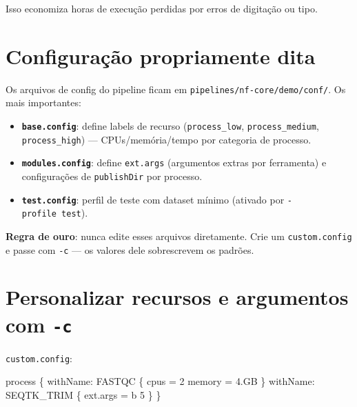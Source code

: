 \documentclass[
  brazilian,
  letterpaper,
  DIV=11,
  numbers=noendperiod]{scrreprt}
\newenvironment{Shaded}{\begin{snugshade}}{\end{snugshade}}
\newcommand{\DecValTok}[1]{\textcolor[rgb]{0.68,0.00,0.00}{#1}}
\newcommand{\FloatTok}[1]{\textcolor[rgb]{0.68,0.00,0.00}{#1}}
\newcommand{\NormalTok}[1]{\textcolor[rgb]{0.00,0.23,0.31}{#1}}
\newcommand{\OperatorTok}[1]{\textcolor[rgb]{0.37,0.37,0.37}{#1}}
\newcommand{\StringTok}[1]{\textcolor[rgb]{0.13,0.47,0.30}{#1}}
\providecommand{\tightlist}{%
  \setlength{\itemsep}{0pt}\setlength{\parskip}{0pt}}
\begin{document}
Isso economiza horas de execução perdidas por erros de digitação ou
tipo.

\section{Configuração propriamente
dita}\label{configurauxe7uxe3o-propriamente-dita}

Os arquivos de config do pipeline ficam em
\texttt{pipelines/nf-core/demo/conf/}. Os mais importantes:

\begin{itemize}
\tightlist
\item
  \textbf{\texttt{base.config}}: define labels de recurso
  (\texttt{process\_low}, \texttt{process\_medium},
  \texttt{process\_high}) --- CPUs/memória/tempo por categoria de
  processo.
\item
  \textbf{\texttt{modules.config}}: define \texttt{ext.args} (argumentos
  extras por ferramenta) e configurações de \texttt{publishDir} por
  processo.
\item
  \textbf{\texttt{test.config}}: perfil de teste com dataset mínimo
  (ativado por \texttt{-profile\ test}).
\end{itemize}

\textbf{Regra de ouro}: nunca edite esses arquivos diretamente. Crie um
\texttt{custom.config} e passe com \texttt{-c} --- os valores dele
sobrescrevem os padrões.

\section{\texorpdfstring{Personalizar recursos e argumentos com
\texttt{-c}}{Personalizar recursos e argumentos com -c}}\label{personalizar-recursos-e-argumentos-com--c}

\texttt{custom.config}:

\begin{Shaded}
\begin{Highlighting}[]
\NormalTok{process }\OperatorTok{\{}
\NormalTok{    withName}\OperatorTok{:} \StringTok{\textquotesingle{}FASTQC\textquotesingle{}} \OperatorTok{\{}
\NormalTok{        cpus   }\OperatorTok{=} \DecValTok{2}
\NormalTok{        memory }\OperatorTok{=} \FloatTok{4.}\NormalTok{GB}
    \OperatorTok{\}}
\NormalTok{    withName}\OperatorTok{:} \StringTok{\textquotesingle{}SEQTK\_TRIM\textquotesingle{}} \OperatorTok{\{}
\NormalTok{        ext}\OperatorTok{.}\NormalTok{args }\OperatorTok{=} \StringTok{\textquotesingle{}{-}b 5\textquotesingle{}}
    \OperatorTok{\}}
\OperatorTok{\}}
\end{Highlighting}
\end{Shaded}
\end{document}
